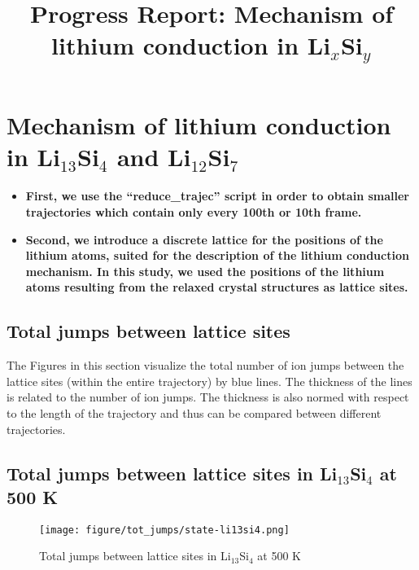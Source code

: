 \documentclass{article}
\begin{document}
\title{Progress Report: Mechanism of lithium conduction in Li$_x$Si$_y$}

\setcounter{Maxaffil}{0}
\renewcommand\Affilfont{\itshape\small}


\maketitle




 \newpage
\newpage






 \section{Mechanism of lithium conduction in Li$_{13}$Si$_4$ and Li$_{12}$Si$_7$}
 
 
 
 
 
\begin{itemize}
  \item \textbf{First, we use the ``reduce\_trajec'' script in order to obtain smaller trajectories which contain only  every 100th or 10th frame. }
  \item \textbf{Second, we introduce a discrete lattice for the positions of the lithium atoms, suited for the description of the lithium conduction mechanism. In this study, we used the positions of the lithium atoms resulting from  the relaxed crystal structures as   lattice sites.}
\end{itemize}









\subsection{Total jumps between lattice sites}

 The Figures in this section visualize the  total number of ion jumps  between the lattice sites (within the entire trajectory)  by blue lines. The thickness of the lines is related to the number of ion jumps. The thickness is also normed with respect to the length of the trajectory and thus can be compared between different trajectories.
 
 
\subsection{Total jumps between lattice sites in Li$_13$Si$_4$ at 500 K}
\begin{figure}[h!]
\centering
\texttt{[image: figure/tot\_jumps/state-li13si4.png]}
\caption{Total jumps between lattice sites in Li$_13$Si$_4$ at 500 K} 
\end{figure}
\end{document}

